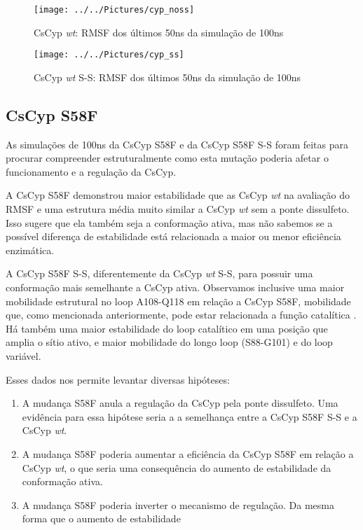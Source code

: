   

\begin{figure}[ht!]
	\centering
	\texttt{[image: ../../Pictures/cyp\_noss]}
	\caption{CsCyp \textit{wt}: RMSF dos últimos 50ns da simulação de 100ns}
\end{figure}
     
\begin{figure}[ht!]
	\centering
	\texttt{[image: ../../Pictures/cyp\_ss]}
	\caption{CsCyp \textit{wt} S-S: RMSF dos últimos 50ns da simulação de 100ns}
\end{figure}

\subsection*{CsCyp S58F}

As simulações de 100ns da CsCyp S58F e da CsCyp S58F S-S foram feitas para procurar compreender estruturalmente como esta mutação poderia afetar o funcionamento e a regulação da CsCyp.  

A CsCyp S58F demonstrou maior estabilidade que as CsCyp \textit{wt} na avaliação do RMSF e uma estrutura média muito similar a CsCyp \textit{wt} sem a ponte dissulfeto. Isso sugere que ela também seja a conformação ativa, mas não sabemos se a possível diferença de estabilidade está relacionada a maior ou menor eficiência enzimática.

A CsCyp S58F S-S, diferentemente da CsCyp \textit{wt} S-S, para possuir uma conformação mais semelhante a CsCyp ativa. Observamos inclusive uma maior mobilidade estrutural no loop A108-Q118 em relação a CsCyp S58F, mobilidade que, como mencionada anteriormente, pode estar relacionada a função catalítica \citep{Eisenmesser2002}. Há também uma maior estabilidade do loop catalítico em uma posição que amplia o sítio ativo, e maior mobilidade do longo loop (S88-G101) e do loop variável.

Esses dados nos permite levantar diversas hipóteses:

\begin{enumerate}
	\item A mudança S58F anula a regulação da CsCyp pela ponte dissulfeto. Uma evidência para essa hipótese seria a a semelhança entre a CsCyp S58F S-S e a CsCyp \textit{wt}.
	\item A mudança S58F poderia aumentar a eficiência da CsCyp S58F em relação a CsCyp \textit{wt}, o que seria uma consequência do aumento de estabilidade da conformação ativa.
	\item A mudança S58F poderia inverter o mecanismo de regulação. Da mesma forma que o aumento de estabilidade 
\end{enumerate}



